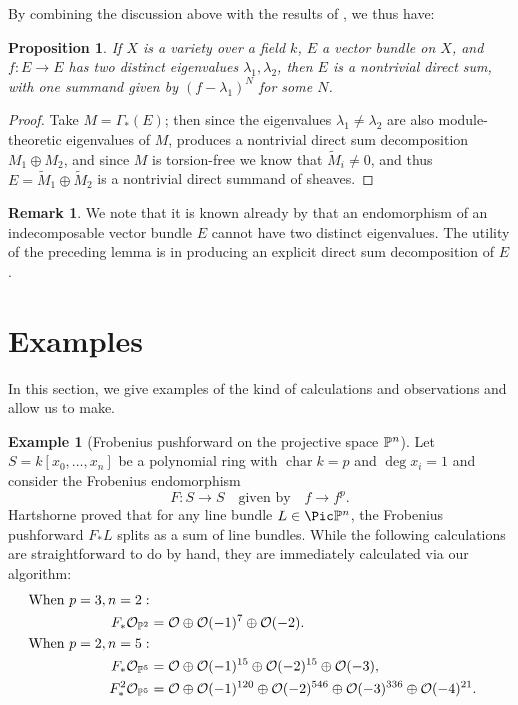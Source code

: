 \documentclass[12pt]{article}
\def\OO{\mathcal O}
\theoremstyle{theorem}
\numberwithin{thm}{section}
\newtheorem{prop}[thm]{Proposition}
\theoremstyle{definition}
\newtheorem{exa}[thm]{Example}
\newtheorem{rem}[thm]{Remark}
\begin{document}
By combining the discussion above with the results of , we thus have:

\begin{prop}
  If $X$ is a variety over a field $k$,
  $E$ a vector bundle on $X$, and $f:E\to E$ has two distinct eigenvalues $\lambda_1,\lambda_2$, then $E$ is a nontrivial direct sum, with one summand given by $(f-\lambda_1)^{N}$ for some $N$.
\end{prop}

\begin{proof}
  Take $M= \Gamma_*(E)$; then since the eigenvalues $\lambda_1\neq \lambda_2$ are also module-theoretic eigenvalues of $M$,  produces a nontrivial direct sum decomposition $M_1\oplus M_2$, and since $M$ is torsion-free we know that $\widetilde M_i\neq 0$, and thus $E=\widetilde M_1\oplus \widetilde M_2$ is a nontrivial direct summand of sheaves.
\end{proof}

\begin{rem}
  We note that it is known already by \cite[Proposition~15]{Atiyah57} that an endomorphism of an indecomposable vector bundle $E$ cannot have two distinct eigenvalues. The utility of the preceding lemma is in producing an explicit direct sum decomposition of $E$.
\end{rem}


\section{Examples}\label{sec:examples}

In this section, we give examples of the kind of calculations and observations  and  allow us to make.

\renewcommand{\char}{\operatorname{char}}

\begin{exa}[Frobenius pushforward on the projective space $\P^n$]
  Let $S = k[x_0,\dots,x_n]$ be a polynomial ring with $\char k = p$ and $\deg x_i = 1$ and consider the Frobenius endomorphism
  \[ F\colon S\to S \quad \text{given by} \quad f \to f^p. \]
  Hartshorne \cite{Hartshorne1970} proved that for any line bundle $L\in\Pic\P^n$, the Frobenius pushforward $F_*L$ splits as a sum of line bundles. While the following calculations are straightforward to do by hand, they are immediately calculated via our algorithm:
  \begin{align*}
    \text{When }p=3, n=2: \\
    F_*\OO_{\P^2} &= \OO \oplus \OO(-1)^7 \oplus \OO(-2). \\
    \text{When } p=2, n=5: \\
    F_*\OO_{\P^5} &= \OO \oplus \OO(-1)^{15} \oplus \OO(-2)^{15} \oplus \OO(-3), \\
    F_*^2\OO_{\P^5} &= \OO \oplus \OO(-1)^{120} \oplus \OO(-2)^{546} \oplus \OO(-3)^{336} \oplus \OO(-4)^{21}.
  \end{align*}
\end{exa}
\end{document}
